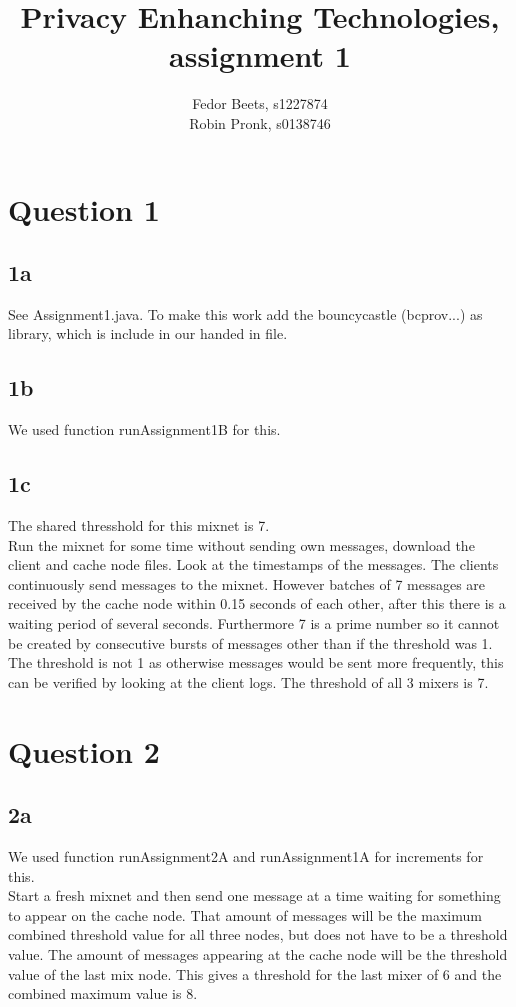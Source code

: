 \documentclass[a4paper,11pt]{article}
\title{Privacy Enhanching Technologies, assignment 1}
\author{Fedor Beets, s1227874\\ Robin Pronk, s0138746}
\begin{document}
\maketitle

\section{Question 1}
\subsection{1a}
 See Assignment1.java. To make this work add the bouncycastle (bcprov...) as library, which is include in our handed in file.
\subsection{1b}
We used function runAssignment1B for this.
\subsection{1c}
The shared thresshold for this mixnet is 7. \\
Run the mixnet for some time without sending own messages, download the client and cache node files. Look at the timestamps of the messages. The clients continuously send messages to the mixnet. However batches of 7 messages are received by the cache node within 0.15 seconds of each other, after this there is a waiting period of several seconds. Furthermore 7 is a prime number so it cannot be created by consecutive bursts of messages other than if the threshold was 1. The threshold is not 1 as otherwise messages would be sent more frequently, this can be verified by looking at the client logs. The threshold of all 3 mixers is 7.

\section{Question 2}
\subsection{2a}
We used function runAssignment2A and runAssignment1A for increments for this. \\

Start a fresh mixnet and then send one message at a time waiting for something to appear on the cache node. That amount of messages will be the maximum combined threshold value for all three nodes, but does not have to be a threshold value. The amount of messages appearing at the cache node will be the threshold value of the last mix node.
This gives a threshold for the last mixer of 6 and the combined maximum value is 8.
\end{document}
